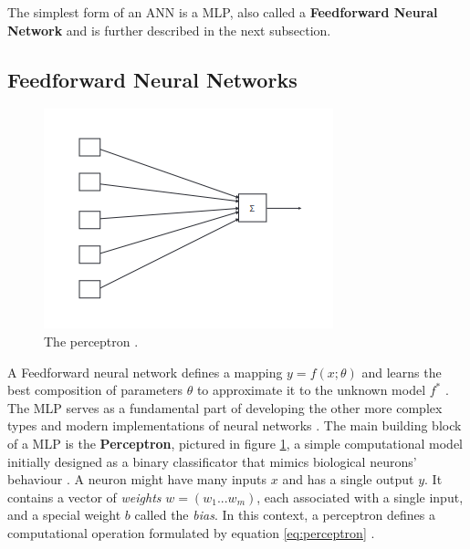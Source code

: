 The simplest form of an \ac{ANN} is a \ac{MLP}, also called a \textbf{Feedforward Neural Network} and is further described in the next subsection. \par 

\subsection{Feedforward Neural Networks} \label{sec:back-mlp}

\begin{figure}[H]
	\centering
	\includegraphics[width=0.60\linewidth]{./figures/perceptron.png}
	\caption{The perceptron \cite{charniakIntroductionDeepLearning2018}.}
	\label{fig:perceptron}
\end{figure}

A Feedforward neural network defines a mapping $y=f(x;\theta)$ and learns the best composition of parameters $\theta$ to approximate it to the unknown model $f^*$ \cite{charniakIntroductionDeepLearning2018, goodfellowDeepLearning2016}. The \ac{MLP} serves as a fundamental part of developing the other more complex types and modern implementations of neural networks \cite{charniakIntroductionDeepLearning2018}. 
The main building block of a \ac{MLP} is the \textbf{Perceptron}, pictured in figure \ref{fig:perceptron}, a simple computational model initially designed as a binary classificator that mimics biological neurons' behaviour \cite{charniakIntroductionDeepLearning2018}. A neuron might have many inputs $x$ and has a single output $y$. It contains a vector of \textit{weights} $w = (w_1 ... w_m)$, each associated with a single input, and a special weight $b$ called the \textit{bias}. In this context, a perceptron defines a computational operation formulated by equation \ref{eq:perceptron} \cite{charniakIntroductionDeepLearning2018}. \par

